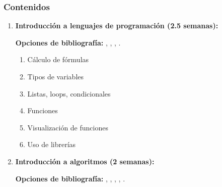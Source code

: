 \begin{refsection}
\begin{enumerate}
\end{enumerate}

\subsubsection*{Contenidos}

\begin{enumerate}
\item \textbf{Introducción a lenguajes de programación (2.5 semanas):}

\textbf{Opciones de bibliografía:} \cite{Ste16}, \cite{CCC22}, \cite{langtangen_primer_2016}, \cite{BRR15}.


\begin{enumerate} 
    \item Cálculo de fórmulas
    \item Tipos de variables
    \item Listas, loops, condicionales
    \item Funciones
    \item Visualización de funciones
    \item Uso de librerías
\end{enumerate}

\item \textbf{Introducción a algoritmos (2 semanas):}

\textbf{Opciones de bibliografía:} \cite{Knu97}, \cite{CLR--IntroToAlgorithms}, \cite{Ueh19}, \cite{Fer17}, \cite{GKP--ConcreteMathematics}.


\end{enumerate}
\end{refsection}
